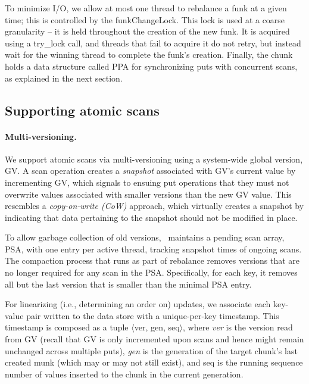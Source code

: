 To minimize I/O, we allow at most one thread to rebalance a funk at a given time; this is controlled by 
the  funkChangeLock. This lock is used at a coarse granularity -- it is held throughout the creation of the new funk. 
It is acquired using a try\_lock call, and threads that fail to acquire it do not retry, but instead wait for the winning thread 
to complete the funk's creation.
Finally, the chunk holds a data structure called PPA for synchronizing  puts with concurrent scans, as explained in the next section. 




\subsection{Supporting atomic scans}
\label{ssec:scans}


\paragraph{Multi-versioning.}

We support atomic scans via multi-versioning using a system-wide global version, GV. 
A scan operation creates a \emph{snapshot} associated with GV's current value by incrementing GV, 
which signals to ensuing put operations that they must not overwrite values associated with 
smaller versions than the new GV value.
This resembles a \emph{copy-on-write (CoW)} approach, which virtually creates a snapshot by 
indicating that data pertaining to the snapshot should not be modified in place.  

To allow garbage collection of old versions, \sys\  maintains 
a pending scan array, PSA, with one entry per active thread, tracking snapshot times of ongoing scans.
The compaction process that runs as part of rebalance removes versions that are no longer required for any  
scan in the PSA. Specifically, for each key, it removes all but the last version that is smaller than the minimal
PSA entry. 

For linearizing (i.e., determining an order on) updates, we associate each key-value pair written to the data store 
with a unique-per-key timestamp.
This timestamp is composed as a tuple $\langle$ver, gen, seq$\rangle$, where \emph{ver} is  the version read from GV 
(recall that GV is only incremented upon scans and hence might remain unchanged across multiple puts),
\emph{gen} is the generation of the target chunk's last created munk  (which may or may not still exist), 
and seq is the running sequence number of values inserted to the chunk in the current generation.

